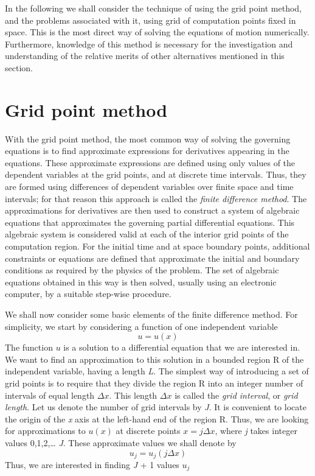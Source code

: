 In the following we shall consider the technique of using the grid point method, and the problems associated with it, using grid of computation points fixed in space. This is the most direct way of solving the equations of motion numerically. Furthermore, knowledge of this method is necessary for the investigation and understanding of the relative merits of other alternatives mentioned in this section.
\section{Grid point method}
With the grid point method, the most common way of solving the governing equations is to find approximate expressions for derivatives appearing in the equations. These approximate expressions are defined using only values of the dependent variables at the grid points, and at discrete time intervals. Thus, they are formed using differences of dependent variables over finite space and time intervals; for that reason this approach is called the \textit{finite difference method}. The approximations for derivatives are then used to construct a system of algebraic equations that approximates the governing partial differential equations. This algebraic system is considered valid at each of the interior grid points of the computation region. For the initial time and at space boundary points, additional constraints or equa­tions are defined that approximate the initial and bound­ary conditions as required by the physics of the problem. The set of algebraic equations obtained in this way is then solved, usually using an electronic computer, by a suitable step-wise procedure.

We shall now consider some basic elements of the finite difference method. For simplicity, we start by considering a function of one independent variable $$u=u(x)$$
The function $u$ is a solution to a differential equation that we are interested in. We want to find an approxima­tion to this solution in a bounded region R of the inde­pendent variable, having a length \textit{L}. The simplest way of introducing a set of grid points is to require that they divide the region R into an integer number of intervals of equal length $\Delta x$. This length $\Delta x$ is called the \textit{grid interval}, or \textit{grid length}. Let us denote the number of grid intervals by \textit{J}. It is convenient to locate the origin of the \textit{x} axis at the left-hand end of the region R. Thus, we are looking for approximations to $u(x)$ at discrete points $x=j\Delta x$, where \textit{j} takes integer values 0,1,2,… \textit{J}. These approximate values we shall denote by $$u_j=u_j(j\Delta x)$$
Thus, we are interested in finding \textit{J} + 1 values $u_j$

